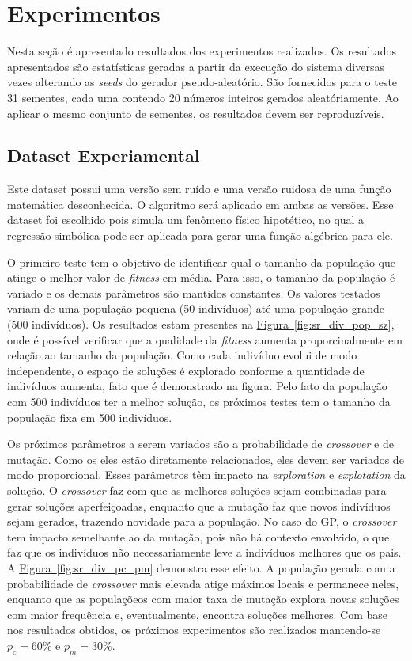 \documentclass[a4paper]{article}
\begin{document}
\section{Experimentos}
Nesta seção é apresentado resultados dos experimentos realizados. Os resultados
apresentados são estatísticas geradas a partir da execução do sistema diversas
vezes alterando as \textit{seeds} do gerador pseudo-aleatório. São fornecidos
para o teste 31 sementes, cada uma contendo 20 números inteiros gerados
aleatóriamente.  Ao aplicar o mesmo conjunto de sementes, os resultados devem
ser reproduzíveis.

\subsection{Dataset Experiamental}
Este dataset possui uma versão sem ruído e uma versão ruidosa de uma função
matemática desconhecida. O algoritmo será aplicado em ambas as versões. Esse
dataset foi escolhido pois simula um fenômeno físico hipotético, no qual a
regressão simbólica pode ser aplicada para gerar uma função algébrica para ele.

O primeiro teste tem o objetivo de identificar qual o tamanho da população que
atinge o melhor valor de \textit{fitness} em média. Para isso, o tamanho da
população é variado e os demais parâmetros são mantidos constantes. Os valores
testados variam de uma população pequena (50 indivíduos) até uma população
grande (500 indivíduos). Os resultados estam presentes na
\hyperref[fig:sr_div_pop_sz]{Figura~\ref*{fig:sr_div_pop_sz}}, onde é possível
verificar que a qualidade da \textit{fitness} aumenta proporcinalmente em
relação ao tamanho da população. Como cada indivíduo evolui de modo
independente, o espaço de soluções é explorado conforme a quantidade de
indivíduos aumenta, fato que é demonstrado na figura. Pelo fato da população
com 500 indivíduos ter a melhor solução, os próximos testes tem o tamanho da
população fixa em 500 indivíduos.

Os próximos parâmetros a serem variados são a probabilidade de
\textit{crossover} e de mutação. Como os eles estão diretamente relacionados,
eles devem ser variados de modo proporcional. Esses parâmetros têm impacto na
\textit{exploration} e \textit{explotation} da solução. O \textit{crossover} faz
com que as melhores soluções sejam combinadas para gerar soluções aperfeiçoadas,
enquanto que a mutação faz que novos indivíduos sejam gerados, trazendo novidade
para a população. No caso do GP, o \textit{crossover} tem impacto semelhante ao
da mutação, pois não há contexto envolvido, o que faz que os indivíduos não
necessariamente leve a indivíduos melhores que os pais. A
\hyperref[fig:sr_div_pc_pm]{Figura~\ref*{fig:sr_div_pc_pm}} demonstra esse
efeito. A população gerada com a probabilidade de \textit{crossover} mais
elevada atige máximos locais e permanece neles, enquanto que as populaçõeos com
maior taxa de mutação explora novas soluções com maior frequência e,
eventualmente, encontra soluções melhores. Com base nos resultados obtidos, os
próximos experimentos são realizados mantendo-se $p_c=60\%$ e $p_m=30\%$.
\end{document}
